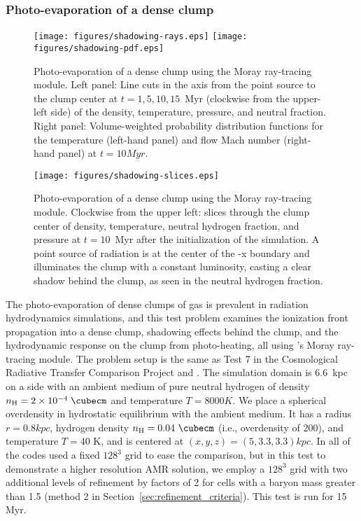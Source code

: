 \subsubsection{Photo-evaporation of a dense clump}
\label{sec.tests.raytracing}

\begin{figure}
  \centering
  \texttt{[image: figures/shadowing-rays.eps]}
  \hfill
  \texttt{[image: figures/shadowing-pdf.eps]}
  \caption{Photo-evaporation of a dense clump using the Moray
    ray-tracing module.  Left panel: Line cuts in the axis from the
    point source to the clump center at $t = 1, 5, 10, 15$~Myr
    (clockwise from the upper-left side) of the density, temperature,
    pressure, and neutral fraction.  Right panel: Volume-weighted
    probability distribution functions for the temperature (left-hand
    panel) and flow Mach number (right-hand panel) at $t = 10
    \unit{Myr}$.}
  \label{fig:shadowing1}
\end{figure}

\begin{figure}
  \centering
  \texttt{[image: figures/shadowing-slices.eps]}
  \caption{Photo-evaporation of a dense clump using the Moray
ray-tracing module.  Clockwise from the upper left: slices
through the clump center of density, temperature, neutral hydrogen
fraction, and pressure at $t=10$~Myr after the initialization of the
simulation.  A point source of radiation is at the center of the -x
boundary and illuminates the clump with a constant luminosity, casting
a clear shadow behind the clump, as seen in the neutral hydrogen
fraction.}
  \label{fig:shadowing2}
\end{figure}

The photo-evaporation of dense clumps of gas is prevalent in radiation
hydrodynamics simulations, and this test problem examines the
ionization front propagation into a dense clump, shadowing effects
behind the clump, and the hydrodynamic response on the clump from
photo-heating, all using \enzo's Moray ray-tracing module.  The
problem setup is the same as Test 7 in the Cosmological Radiative
Transfer Comparison Project \citep{IlievEtAl2009} and
\citet{Wise11_Moray}.  The simulation domain is 6.6~kpc on a side with
an ambient medium of pure neutral hydrogen of density $n_{\rm H} = 2
\times 10^{-4}\; \cubecm$ and temperature $T = 8000 \unit{K}$.  We
place a spherical overdensity in hydrostatic equilibrium with the
ambient medium.  It has a radius $r = 0.8 \unit{kpc}$, hydrogen
density $n_{\rm H} = 0.04\ \cubecm$ (i.e., overdensity of 200), and
temperature $T = 40$ K, and is centered at $(x,y,z) = (5, 3.3, 3.3)
\unit{kpc}$.  In \citet{IlievEtAl2009} all of the codes used a fixed
$128^3$ grid to ease the comparison, but in this test to demonstrate a
higher resolution AMR solution, we employ a $128^3$ grid with two
additional levels of refinement by factors of 2 for cells with a
baryon mass greater than 1.5 (method 2 in
Section~\ref{sec:refinement_criteria}). This test is run for 15 Myr.

